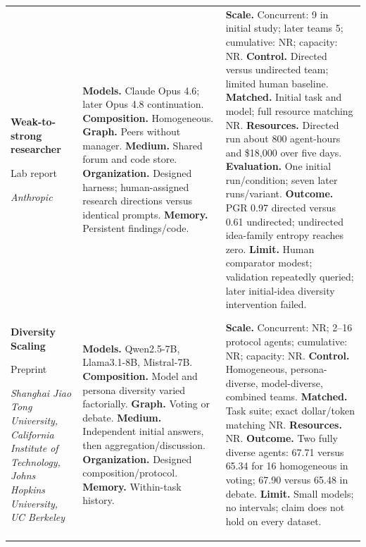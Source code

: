 \begin{longtable}{@{}>{\raggedright\arraybackslash}p{}>{\raggedright\arraybackslash}p{}>{\raggedright\arraybackslash}p{}@{}}
\textbf{Weak-to-strong researcher}\par \citep{automated-w2s-researcher}\par Lab report\par\emph{Anthropic} & \textbf{Models.} Claude Opus 4.6; later Opus 4.8 continuation. \textbf{Composition.} Homogeneous. \textbf{Graph.} Peers without manager. \textbf{Medium.} Shared forum and code store. \textbf{Organization.} Designed harness; human-assigned research directions versus identical prompts. \textbf{Memory.} Persistent findings/code. & \textbf{Scale.} Concurrent: 9 in initial study; later teams 5; cumulative: NR; capacity: NR. \textbf{Control.} Directed versus undirected team; limited human baseline. \textbf{Matched.} Initial task and model; full resource matching NR. \textbf{Resources.} Directed run about 800 agent-hours and \$18,000 over five days. \textbf{Evaluation.} One initial run/condition; seven later runs/variant. \textbf{Outcome.} PGR 0.97 directed versus 0.61 undirected; undirected idea-family entropy reaches zero. \textbf{Limit.} Human comparator modest; validation repeatedly queried; later initial-idea diversity intervention failed. \\ \addlinespace[5pt]
\textbf{Diversity Scaling}\par \citep{diversity-scaling}\par Preprint\par\emph{Shanghai Jiao Tong University, California Institute of Technology, Johns Hopkins University, UC Berkeley} & \textbf{Models.} Qwen2.5-7B, Llama3.1-8B, Mistral-7B. \textbf{Composition.} Model and persona diversity varied factorially. \textbf{Graph.} Voting or debate. \textbf{Medium.} Independent initial answers, then aggregation/discussion. \textbf{Organization.} Designed composition/protocol. \textbf{Memory.} Within-task history. & \textbf{Scale.} Concurrent: NR; 2--16 protocol agents; cumulative: NR; capacity: NR. \textbf{Control.} Homogeneous, persona-diverse, model-diverse, combined teams. \textbf{Matched.} Task suite; exact dollar/token matching NR. \textbf{Resources.} NR. \textbf{Outcome.} Two fully diverse agents: 67.71 versus 65.34 for 16 homogeneous in voting; 67.90 versus 65.48 in debate. \textbf{Limit.} Small models; no intervals; claim does not hold on every dataset. \\ \addlinespace[5pt]

\end{longtable}
